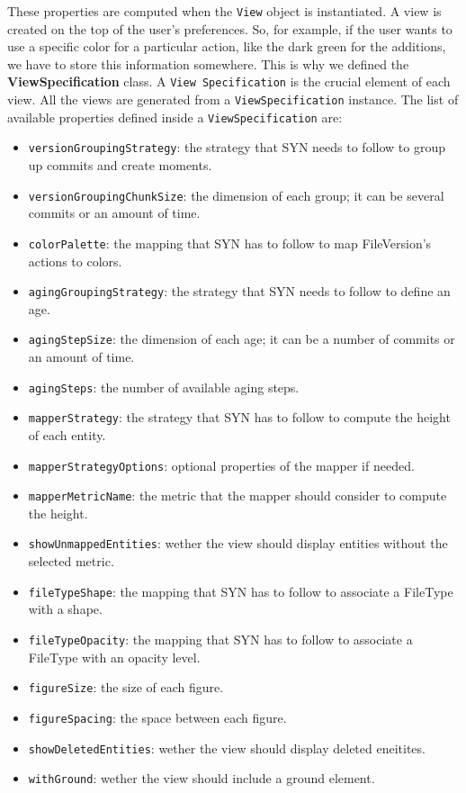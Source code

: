 These properties are computed when the \texttt{View} object is instantiated. A view is created on the top of the user's preferences. 
So, for example, if the user wants to use a specific color for a particular action, like the dark green for the additions, we have to store this information somewhere. 
This is why we defined the \textbf{ViewSpecification} class. A \texttt{View Specification} is the crucial element of each view. 
All the views are generated from a \texttt{ViewSpecification} instance. The list of available properties defined inside a \texttt{ViewSpecification} are:
\begin{itemize}
    \item \texttt{versionGroupingStrategy}: the strategy that SYN needs to follow to group up commits and create moments.
    \item \texttt{versionGroupingChunkSize}: the dimension of each group; it can be several commits or an amount of time. 
    \item \texttt{colorPalette}: the mapping that SYN has to follow to map FileVersion's actions to colors. 
    \item \texttt{agingGroupingStrategy}: the strategy that SYN needs to follow to define an age.
    \item \texttt{agingStepSize}: the dimension of each age; it can be a number of commits or an amount of time. 
    \item \texttt{agingSteps}: the number of available aging steps. 
    \item \texttt{mapperStrategy}: the strategy that SYN has to follow to compute the height of each entity.
    \item \texttt{mapperStrategyOptions}: optional properties of the mapper if needed.
    \item \texttt{mapperMetricName}: the metric that the mapper should consider to compute the height. 
    \item \texttt{showUnmappedEntities}: wether the view should display entities without the selected metric.
    \item \texttt{fileTypeShape}: the mapping that SYN has to follow to associate a FileType with a shape.
    \item \texttt{fileTypeOpacity}: the mapping that SYN has to follow to associate a FileType with an opacity level.
    \item \texttt{figureSize}: the size of each figure.
    \item \texttt{figureSpacing}: the space between each figure.
    \item \texttt{showDeletedEntities}: wether the view should display deleted eneitites.
    \item \texttt{withGround}: wether the view should include a ground element.
\end{itemize}

